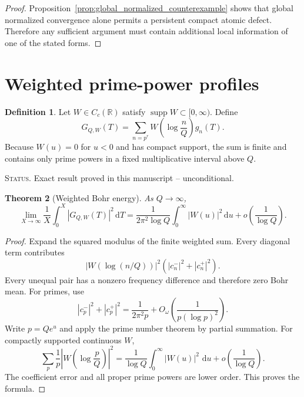 \documentclass[11pt]{amsart}
\numberwithin{equation}{section}
\theoremstyle{plain}
\newtheorem{theorem}{Theorem}[section]
\theoremstyle{definition}
\newtheorem{definition}[theorem]{Definition}
\theoremstyle{remark}
\newcommand{\1}{\mathbf{1}}
\newcommand{\dd}{\,\mathrm{d}}
\newcommand{\statusnote}[1]{%
  \par\smallskip\noindent
  \begingroup\footnotesize\textsc{Status.} #1\endgroup
  \par\smallskip}
\begin{document}
\begin{proof}
Proposition~\ref{prop:global_normalized_counterexample} shows that global
normalized convergence alone permits a persistent compact atomic defect.
Therefore any sufficient argument must contain additional local
information of one of the stated forms.
\end{proof}

\section{Weighted prime-power profiles}
\label{sec:weighted_profiles}

\begin{definition}
\label{def:weighted_profile}
Let \(W\in C_c(\mathbb R)\) satisfy
\(\operatorname{supp}W\subset[0,\infty)\).  Define
\begin{equation}
G_{Q,W}(T)
=
\sum_{n=p^r}
W\left(\log\frac nQ\right)g_n(T).
\label{eq:weighted_profile_sum}
\end{equation}
Because \(W(u)=0\) for \(u<0\) and has compact support, the sum is finite
and contains only prime powers in a fixed multiplicative interval above
\(Q\).
\end{definition}

\statusnote{Exact result proved in this manuscript -- unconditional.}
\begin{theorem}[Weighted Bohr energy]
\label{thm:weighted_bohr_energy}
As $Q\to\infty$,
\begin{equation}
\lim_{X\to\infty}\frac1X\int_0^X|G_{Q,W}(T)|^2\dd T
=
\frac1{2\pi^2\log Q}
\int_0^\infty|W(u)|^2\dd u
+
o\left(\frac1{\log Q}\right).
\label{eq:weighted_bohr_energy}
\end{equation}
\end{theorem}

\begin{proof}
Expand the squared modulus of the finite weighted sum.  Every diagonal term
contributes
\begin{equation}
|W(\log(n/Q))|^2
\left(|c_n^-|^2+|c_n^+|^2\right).
\label{eq:weighted_bohr_diagonal}
\end{equation}
Every unequal pair has a nonzero frequency difference and therefore zero
Bohr mean.  For primes, use
\begin{equation}
|c_p^-|^2+|c_p^+|^2
=
\frac1{2\pi^2p}
+
O_\omega\left(\frac1{p(\log p)^2}\right).
\label{eq:weighted_bohr_prime_coeff}
\end{equation}
Write \(p=Qe^u\) and apply the prime number theorem by partial summation.
For compactly supported continuous \(W\),
\begin{equation}
\sum_p\frac1p
\left|W\!\left(\log\frac pQ\right)\right|^2
=
\frac1{\log Q}
\int_0^\infty|W(u)|^2\,\dd u
+
o\left(\frac1{\log Q}\right).
\label{eq:weighted_bohr_pnt}
\end{equation}
The coefficient error and all proper prime powers are lower order.  This
proves the formula.
\end{proof}
\end{document}
